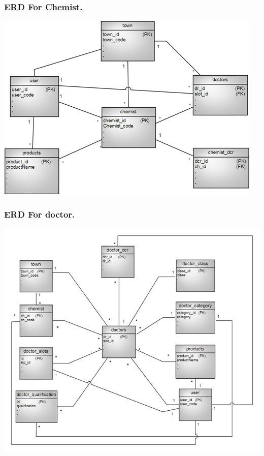 \subsubsection{ERD For Chemist.}
\includegraphics[scale=0.7]{Diag/ERDchemist.png}
\label{abc}

\subsubsection{ERD For doctor.}
\includegraphics[scale=0.7]{Diag/ERDdoctor.png}
\label{abc}


%

